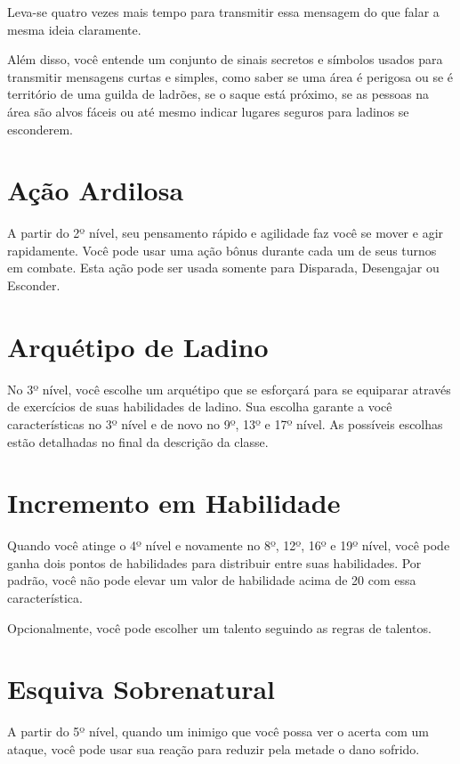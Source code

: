 \documentclass{RPG_Adventure}[2021/10/20]
\begin{document}
Leva-se quatro vezes mais tempo para transmitir essa mensagem do que falar a
mesma ideia claramente.

Além disso, você entende um conjunto de sinais secretos e símbolos usados para
transmitir mensagens curtas e simples, como saber se uma área é perigosa ou se é
território de uma guilda de ladrões, se o saque está próximo, se as pessoas na
área são alvos fáceis ou até mesmo indicar lugares seguros para ladinos se
esconderem.

\section*{Ação Ardilosa}%

A partir do 2º nível, seu pensamento rápido e agilidade faz você se mover e agir
rapidamente. Você pode usar uma ação bônus durante cada um de seus turnos em
combate. Esta ação pode ser usada somente para Disparada, Desengajar ou
Esconder.

\section*{Arquétipo de Ladino}%

No 3º nível, você escolhe um arquétipo que se esforçará para se equiparar
através de exercícios de suas habilidades de ladino. Sua escolha garante a você
características no 3º nível e de novo no 9º, 13º e 17º nível. As possíveis
escolhas estão detalhadas no final da descrição da classe.

\section*{Incremento em Habilidade}%

Quando você atinge o 4º nível e novamente no 8º, 12º, 16º e 19º nível, você pode
ganha dois pontos de habilidades para distribuir entre suas habilidades. Por
padrão, você não pode elevar um valor de habilidade acima de 20 com essa
característica.

Opcionalmente, você pode escolher um talento seguindo as regras de talentos.

\section*{Esquiva Sobrenatural}%

A partir do 5º nível, quando um inimigo que você possa ver o acerta com um
ataque, você pode usar sua reação para reduzir pela metade o dano sofrido.
\end{document}
